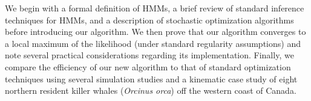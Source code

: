 We begin with a formal definition of HMMs, a brief review of standard inference techniques for HMMs, and a description of stochastic optimization algorithms before introducing our algorithm. We then prove that our algorithm converges to a local maximum of the likelihood (under standard regularity assumptions) and note several practical considerations regarding its implementation. Finally, %
we compare the efficiency of our new algorithm to that of standard optimization techniques using several simulation studies and a kinematic case study of eight northern resident killer whales ({\em{Orcinus orca}}) off the western coast of Canada. 





